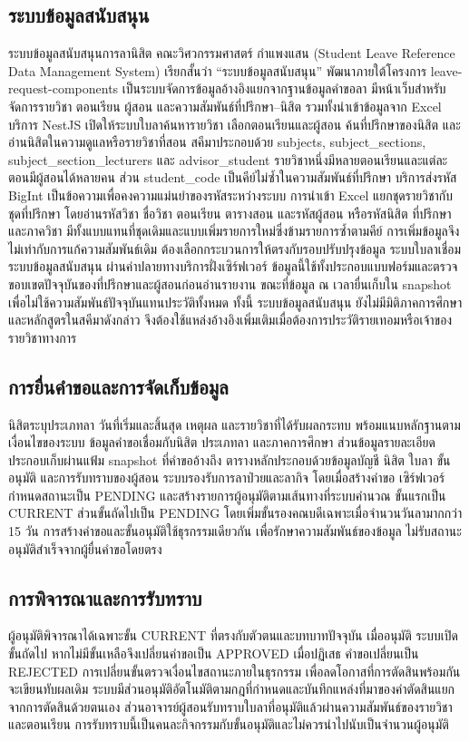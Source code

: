 \subsection{ระบบข้อมูลสนับสนุน}
ระบบข้อมูลสนับสนุนการลานิสิต คณะวิศวกรรมศาสตร์ กำแพงแสน (Student Leave Reference Data Management System) เรียกสั้นว่า ``ระบบข้อมูลสนับสนุน'' พัฒนาภายใต้โครงการ leave-request-components เป็นระบบจัดการข้อมูลอ้างอิงแยกจากฐานข้อมูลคำขอลา มีหน้าเว็บสำหรับจัดการรายวิชา ตอนเรียน ผู้สอน และความสัมพันธ์ที่ปรึกษา--นิสิต รวมทั้งนำเข้าข้อมูลจาก Excel บริการ NestJS เปิดให้ระบบใบลาค้นหารายวิชา เลือกตอนเรียนและผู้สอน ค้นที่ปรึกษาของนิสิต และอ่านนิสิตในความดูแลหรือรายวิชาที่สอน \cite{components}
สคีมาประกอบด้วย subjects, subject\_sections, subject\_section\_lecturers และ advisor\_student รายวิชาหนึ่งมีหลายตอนเรียนและแต่ละตอนมีผู้สอนได้หลายคน ส่วน student\_code เป็นคีย์ไม่ซ้ำในความสัมพันธ์ที่ปรึกษา บริการส่งรหัส BigInt เป็นข้อความเพื่อคงความแม่นยำของรหัสระหว่างระบบ
การนำเข้า Excel แยกชุดรายวิชากับชุดที่ปรึกษา โดยอ่านรหัสวิชา ชื่อวิชา ตอนเรียน ตารางสอน และรหัสผู้สอน หรือรหัสนิสิต ที่ปรึกษา และภาควิชา มีทั้งแบบแทนที่ชุดเดิมและแบบเพิ่มรายการใหม่ซึ่งข้ามรายการซ้ำตามคีย์ การเพิ่มข้อมูลจึงไม่เท่ากับการแก้ความสัมพันธ์เดิม ต้องเลือกกระบวนการให้ตรงกับรอบปรับปรุงข้อมูล
ระบบใบลาเชื่อม ระบบข้อมูลสนับสนุน ผ่านค่าปลายทางบริการฝั่งเซิร์ฟเวอร์ ข้อมูลนี้ใช้ทั้งประกอบแบบฟอร์มและตรวจขอบเขตปัจจุบันของที่ปรึกษาและผู้สอนก่อนอ่านรายงาน ขณะที่ข้อมูล ณ เวลายื่นเก็บใน snapshot เพื่อไม่ใช้ความสัมพันธ์ปัจจุบันแทนประวัติทั้งหมด ทั้งนี้ ระบบข้อมูลสนับสนุน ยังไม่มีมิติภาคการศึกษาและหลักสูตรในสคีมาดังกล่าว จึงต้องใช้แหล่งอ้างอิงเพิ่มเติมเมื่อต้องการประวัติรายเทอมหรือเจ้าของรายวิชาทางการ
\subsection{การยื่นคำขอและการจัดเก็บข้อมูล}
นิสิตระบุประเภทลา วันที่เริ่มและสิ้นสุด เหตุผล และรายวิชาที่ได้รับผลกระทบ พร้อมแนบหลักฐานตามเงื่อนไขของระบบ ข้อมูลคำขอเชื่อมกับนิสิต ประเภทลา และภาคการศึกษา ส่วนข้อมูลรายละเอียดประกอบเก็บผ่านแฟ้ม snapshot ที่คำขออ้างถึง ตารางหลักประกอบด้วยข้อมูลบัญชี นิสิต ใบลา ขั้นอนุมัติ และการรับทราบของผู้สอน \cite{schema}
ระบบรองรับการลาป่วยและลากิจ โดยเมื่อสร้างคำขอ เซิร์ฟเวอร์กำหนดสถานะเป็น PENDING และสร้างรายการผู้อนุมัติตามเส้นทางที่ระบบคำนวณ ขั้นแรกเป็น CURRENT ส่วนขั้นถัดไปเป็น PENDING โดยเพิ่มขั้นรองคณบดีเฉพาะเมื่อจำนวนวันลามากกว่า 15 วัน การสร้างคำขอและขั้นอนุมัติใช้ธุรกรรมเดียวกัน เพื่อรักษาความสัมพันธ์ของข้อมูล ไม่รับสถานะอนุมัติสำเร็จจากผู้ยื่นคำขอโดยตรง
\subsection{การพิจารณาและการรับทราบ}
ผู้อนุมัติพิจารณาได้เฉพาะขั้น CURRENT ที่ตรงกับตัวตนและบทบาทปัจจุบัน เมื่ออนุมัติ ระบบเปิดขั้นถัดไป หากไม่มีขั้นเหลือจึงเปลี่ยนคำขอเป็น APPROVED เมื่อปฏิเสธ คำขอเปลี่ยนเป็น REJECTED การเปลี่ยนขั้นตรวจเงื่อนไขสถานะภายในธุรกรรม เพื่อลดโอกาสที่การตัดสินพร้อมกันจะเขียนทับผลเดิม
ระบบมีส่วนอนุมัติอัตโนมัติตามกฎที่กำหนดและบันทึกแหล่งที่มาของคำตัดสินแยกจากการตัดสินด้วยตนเอง ส่วนอาจารย์ผู้สอนรับทราบใบลาที่อนุมัติแล้วผ่านความสัมพันธ์ของรายวิชาและตอนเรียน การรับทราบนี้เป็นคนละกิจกรรมกับขั้นอนุมัติและไม่ควรนำไปนับเป็นจำนวนผู้อนุมัติ

